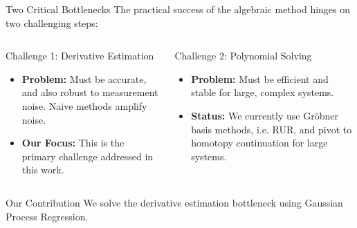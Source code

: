 \documentclass[aspectratio=169]{beamer}
\begin{document}
\begin{frame}[shrink]{Two Critical Bottlenecks}
    \large
    The practical success of the algebraic method hinges on two challenging steps:
    \vspace{2em}

    \begin{columns}[T]
        \begin{column}{0.48\textwidth}
            \begin{block}{Challenge 1: Derivative Estimation}
                \small
                \begin{itemize}
                    \item \textbf{Problem:} Must be accurate, and also robust to measurement noise. Naive methods amplify noise.
                    \item \textbf{Our Focus:} This is the primary challenge addressed in this work.
                \end{itemize}
            \end{block}
        \end{column}
        \begin{column}{0.48\textwidth}
            \begin{block}{Challenge 2: Polynomial Solving}
                \small
                \begin{itemize}
                    \item \textbf{Problem:} Must be efficient and stable for large, complex systems.
                    \item \textbf{Status:} We currently use Gr\"obner basis methods, i.e. RUR, and pivot to homotopy continuation for large systems.
                \end{itemize}
            \end{block}
        \end{column}
    \end{columns}

    \vspace{1em}
    \begin{alertblock}{Our Contribution}
        \centering
        \normalsize
        We solve the derivative estimation bottleneck using Gaussian Process Regression.
    \end{alertblock}
\end{frame}
\end{document}

